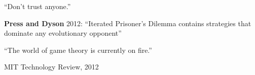 \documentclass{beamer}
\begin{document}
\begin{frame}
    \begin{center}
        \Huge ``Don't trust anyone.''
    \end{center}
\end{frame}

\begin{frame}
    \begin{center}
        \Large \textbf{Press and Dyson} 2012: ``Iterated Prisoner’s Dilemma contains
        strategies that dominate any evolutionary opponent''
    \end{center}
\end{frame}

\begin{frame}
    \begin{center}
        \Large``The world of game theory is currently on fire.''
    \end{center}
    \begin{flushright}
        MIT Technology Review, 2012
    \end{flushright}
\end{frame}
\end{document}
